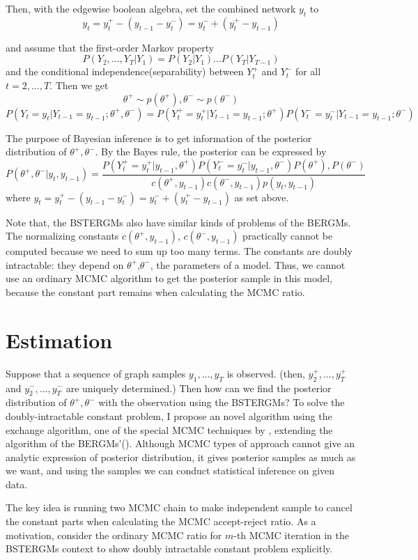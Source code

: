 \documentclass[aspectratio=169,ignorenonframetext,9pt]{beamer}
\theoremstyle{plain}
\theoremstyle{definition}
\begin{document}
Then, with the edgewise boolean algebra, set the combined network $y_t$ to
\[y_t=y_t^+ - (y_{t-1} - y_t^-) = y_t^- + (y_t^+ - y_{t-1})\]

and assume that the first-order Markov property
\[P(Y_2,...,Y_T|Y_1)=P(Y_2|Y_1)...P(Y_T|Y_{T-1})\]
and the conditional independence(separability) between $Y_t^+$ and $Y_t^-$ for all $t=2,...,T$.
Then we get
\[\theta^+ \sim p(\theta^+), \theta^- \sim p(\theta^-)\]
\[P(Y_t=y_t|Y_{t-1}=y_{t-1};\theta^+,\theta^-)=P(Y_t^+=y_t^+|Y_{t-1}=y_{t-1};\theta^+) P(Y_t^-=y_t^-|Y_{t-1}=y_{t-1};\theta^-)\]

The purpose of Bayesian inference is to get information of the posterior distribution of $\theta^+,\theta^-$.
By the Bayes rule, the posterior can be expressed by
\[P(\theta^+,\theta^-|y_t, y_{t-1}) = \frac{P(Y_t^+=y_t^+|y_{t-1},\theta^+) P(Y_t^-=y_t^-|y_{t-1},\theta^-)P(\theta^+),P(\theta^-)}{c(\theta^+,y_{t-1})c(\theta^-,y_{t-1})p(y_t, y_{t-1})} \]
where $y_t=y_t^+ - (y_{t-1} - y_t^-) = y_t^- + (y_t^+ - y_{t-1})$ as set above.

Note that, the BSTERGMs also have similar kinds of problems of the BERGMs.
The normalizing constants $c(\theta^+,y_{t-1})$, $c(\theta^-,y_{t-1})$ practically cannot be computed because we need to sum up too many terms.
The constants are doubly intractable: they depend on $\theta^+$,$\theta^-$, the parameters of a model.
Thus, we cannot use an ordinary MCMC algorithm to get the posterior sample in this model,
because the constant part remains when calculating the MCMC ratio.


\section{Estimation}

Suppose that a sequence of graph samples $y_1,...,y_T$ is observed.
(then, $y_2^+,...,y_T^+$ and $y_2^-,...,y_T^-$ are uniquely determined.) 
Then how can we find the posterior distribution of $\theta^+,\theta^-$ with the observation using the BSTERGMs?
To solve the doubly-intractable constant problem, I propose an novel algorithm using the exchange algorithm,
one of the special MCMC techniques by \cite{RN127}, extending the algorithm of the BERGMs'(\cite{RN115}).
Although MCMC types of approach cannot give an analytic expression of posterior distribution,
it gives posterior samples as much as we want, and using the samples we can conduct statistical inference on given data.

The key idea is running two MCMC chain to make independent sample to cancel the constant parts
when calculating the MCMC accept-reject ratio.
As a motivation, consider the ordinary MCMC ratio for $m$-th MCMC iteration in the BSTERGMs context 
to show doubly intractable constant problem explicitly.
\end{document}
